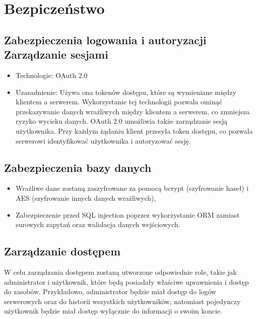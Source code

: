 \documentclass[12pt,titlepage]{article}
\begin{document}
\section{Bezpiczeństwo}
\subsection{Zabezpieczenia logowania i autoryzacji Zarządzanie sesjami}
\begin{itemize}
    \item Technologie: OAuth 2.0
    \item Uzasadnienie: Używa ona tokenów dostępu, które są wymieniane między klientem a serwerem. Wykorzystanie tej technologii pozwala ominąć przekazywanie danych wrażliwych między klientem a serwerem, co zmniejsza ryzyko wycieku danych. OAuth 2.0 umożliwia także zarządzanie sesją użytkownika. Przy każdym żądaniu klient przesyła token dostępu, co pozwala serwerowi identyfikować użytkownika i autoryzować sesję.
\end{itemize}
\subsection{Zabezpieczenia bazy danych}
\begin{itemize}
    \item Wrażliwe dane zostaną zaszyfrowane za pomocą bcrypt (szyfrowanie haseł) i AES (szyfrowanie innych danych wrażliwych),
    \item Zabezpieczenie przed SQL injection poprzez wykorzystanie ORM zamiast surowych zapytań oraz walidacja danych wejściowych.
\end{itemize}

\subsection{Zarządzanie dostępem}
W celu zarządzania dostępem zostaną utworzone odpowiednie role, takie jak administrator i użytkownik, które będą posiadały właściwe uprawnienia i dostęp do zasobów. Przykładowo, administrator będzie miał dostęp do logów serwerowych oraz do historii wszystkich użytkowników, natomiast pojedynczy użytkownik będzie miał dostęp wyłącznie do informacji o swoim koncie.
\end{document}
